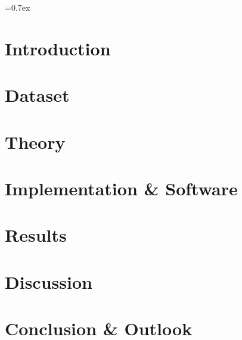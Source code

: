 


	
	\font=0.7ex%

	
	\tableofcontents
	\thispagestyle{empty}
	
	\pagestyle{fancy}
	\fancyhf{}
	\cfoot{\thepage}
	
	\newpage
	\section{Introduction}
	
	
	\section{Dataset}\label{sec:dataset}
	
	
	\section{Theory}\label{sec:theory}
	
	
	\section{Implementation \& Software}				\label{sec:implementation_software}
	
	
	\section{Results}\label{sec:results}
	
	
	\section{Discussion}\label{sec:discussion}
	
	
	\section{Conclusion \& Outlook}\label{sec:conclusion_outlook}
	

	\newpage
	\printbibliography
	
